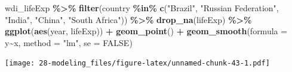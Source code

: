 \documentclass[
  xelatex, ja=standard]{bxjsbook}
\newenvironment{Shaded}{\begin{snugshade}}{\end{snugshade}}
\newcommand{\AttributeTok}[1]{\textcolor[rgb]{0.13,0.29,0.53}{#1}}
\newcommand{\CommentTok}[1]{\textcolor[rgb]{0.56,0.35,0.01}{\textit{#1}}}
\newcommand{\ConstantTok}[1]{\textcolor[rgb]{0.56,0.35,0.01}{#1}}
\newcommand{\FunctionTok}[1]{\textcolor[rgb]{0.13,0.29,0.53}{\textbf{#1}}}
\newcommand{\NormalTok}[1]{#1}
\newcommand{\OtherTok}[1]{\textcolor[rgb]{0.56,0.35,0.01}{#1}}
\newcommand{\SpecialCharTok}[1]{\textcolor[rgb]{0.81,0.36,0.00}{\textbf{#1}}}
\newcommand{\StringTok}[1]{\textcolor[rgb]{0.31,0.60,0.02}{#1}}
\theoremstyle{definition}
\theoremstyle{definition}
\theoremstyle{definition}
\theoremstyle{definition}
\theoremstyle{remark}
\begin{document}
\begin{Shaded}
\end{Shaded}

\begin{Shaded}
\begin{Highlighting}[]
\NormalTok{wdi\_lifeExp }\SpecialCharTok{\%\textgreater{}\%} \FunctionTok{filter}\NormalTok{(country }\SpecialCharTok{\%in\%} \FunctionTok{c}\NormalTok{(}\StringTok{"Brazil"}\NormalTok{, }\StringTok{"Russian Federation"}\NormalTok{, }\StringTok{"India"}\NormalTok{, }\StringTok{"China"}\NormalTok{, }\StringTok{"South Africa"}\NormalTok{)) }\SpecialCharTok{\%\textgreater{}\%} \FunctionTok{drop\_na}\NormalTok{(lifeExp) }\SpecialCharTok{\%\textgreater{}\%}
  \FunctionTok{ggplot}\NormalTok{(}\FunctionTok{aes}\NormalTok{(year, lifeExp)) }\SpecialCharTok{+} \FunctionTok{geom\_point}\NormalTok{() }\SpecialCharTok{+} \FunctionTok{geom\_smooth}\NormalTok{(}\AttributeTok{formula =}\NormalTok{ y}\SpecialCharTok{\textasciitilde{}}\NormalTok{x, }\AttributeTok{method =} \StringTok{"lm"}\NormalTok{, }\AttributeTok{se =} \ConstantTok{FALSE}\NormalTok{)}
\end{Highlighting}
\end{Shaded}

\texttt{[image: 28-modeling\_files/figure-latex/unnamed-chunk-43-1.pdf]}
\end{document}
